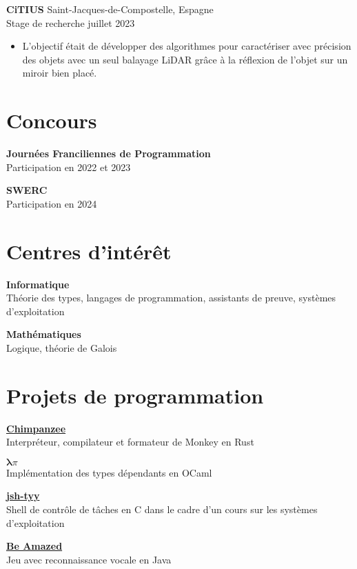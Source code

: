 \documentclass[12pt]{article}
\newcommand{\entry}[4]{{{\textbf{#1}}} \hfill #3 \\ #2 \hfill #4}
\begin{document}
\begin{paracol}{2}
	\entry{CiTIUS}{Stage de recherche}{Saint-Jacques-de-Compostelle, Espagne}{juillet 2023}
	\begin{itemize}[noitemsep,leftmargin=3.5mm,rightmargin=0mm,topsep=6pt]
		\item L'objectif était de développer des algorithmes pour caractériser avec précision des objets avec un seul balayage LiDAR grâce à la réflexion de l'objet sur un miroir bien placé.
	\end{itemize}


	\switchcolumn

	\section{Concours}


	\textbf{Journées Franciliennes de Programmation}\\
	\noindent Participation en 2022 et 2023

	\textbf{SWERC}\\
	\noindent Participation en 2024


\end{paracol}

\section{Centres d'intérêt}


\begin{paracol}{2}

	\entry{Informatique}{Théorie des types, langages de programmation, assistants de preuve, systèmes d'exploitation}{ }{ }

	\switchcolumn


	\entry{Mathématiques}{Logique, théorie de Galois}{ }{ }
\end{paracol}



\section{Projets de programmation}

\begin{paracol}{2}
	\entry{\href{https://github.com/Yag000/chimpanzee}{Chimpanzee}}{Interpréteur, compilateur et formateur de Monkey en Rust}{ }{ }
	\medskip
	\switchcolumn

	\entry{\href{https://moule.informatique.univ-paris-diderot.fr/iglesias/U3bbU3c0}{$\pmb\lambda\pi$}}{Implémentation des types dépendants en OCaml}{ }{ }
	\medskip
	\switchcolumn

	\entry{\href{https://github.com/Yag000/jsh-tyy}{jsh-tyy}}{Shell de contrôle de tâches en C dans le cadre d'un cours sur les systèmes d'exploitation}{ }{ }
	\switchcolumn

	\entry{\href{https://github.com/GabinDDL/L2S2-GYTMY-Game}{Be Amazed}}{Jeu avec reconnaissance vocale en Java}{ }{ }
\end{paracol}
\end{document}
